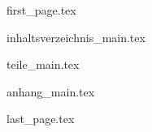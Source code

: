 \documentclass{skript}
\begin{document}
    {first_page.tex}

    {inhaltsverzeichnis_main.tex}

    {teile_main.tex}

    {anhang_main.tex}

    {last_page.tex}
\end{document}
